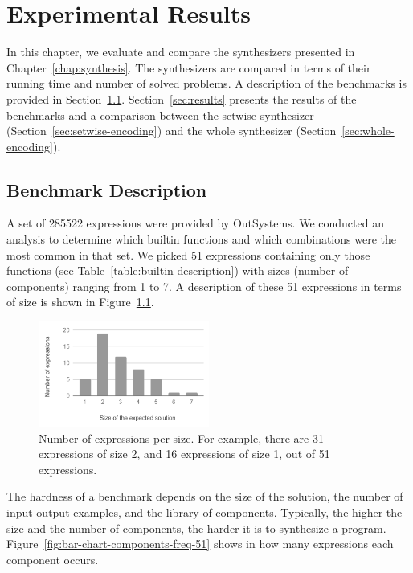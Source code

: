 \chapter{Experimental Results}
\label{chap:experimental-results}

In this chapter, we evaluate and compare the synthesizers presented in
Chapter~\ref{chap:synthesis}.
The synthesizers are compared in terms of their running time and number of
solved problems.
A description of the benchmarks is provided in Section~\ref{sec:bench-desc}.
Section~\ref{sec:results} presents the results of the benchmarks
and a comparison between the setwise synthesizer
(Section~\ref{sec:setwise-encoding}) and the whole synthesizer
(Section~\ref{sec:whole-encoding}).

\section{Benchmark Description}
\label{sec:bench-desc}

A set of 285522 expressions were provided by OutSystems.
We conducted an analysis to determine which builtin functions and which
combinations were the most common in that set.
We picked 51 expressions containing only those functions (see
Table~\ref{table:builtin-description}) with sizes (number of components) ranging
from 1 to 7.
A description of these 51 expressions in terms of size is shown in
Figure~\ref{fig:bar-chart-sizes-51}.

\begin{figure}
  \centering
  \includegraphics[width=0.5\textwidth]{assets/bar-chart-sizes-51.pdf}
  \caption{Number of expressions per size. For example, there are 31
    expressions of size 2, and 16 expressions of size 1, out of 51 expressions.}
  \label{fig:bar-chart-sizes-51}
\end{figure}

The hardness of a benchmark depends on the size of the solution, the number of
input-output examples, and the library of components.
Typically, the higher the size and the number of components, the harder it is to
synthesize a program.
Figure~\ref{fig:bar-chart-components-freq-51} shows in how many expressions each
component occurs.

